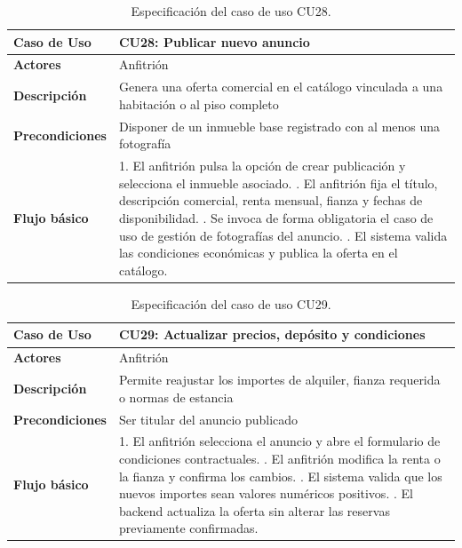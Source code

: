 \begin{table}[H]
\centering
\begin{tabular}{|p{3.1cm}|p{10.9cm}|}
\hline
\textbf{Caso de Uso} & \textbf{CU28: Publicar nuevo anuncio} \\ \hline
\textbf{Actores} & Anfitrión \\ \hline
\textbf{Descripción} & Genera una oferta comercial en el catálogo vinculada a una habitación o al piso completo \\ \hline
\textbf{Precondiciones} & Disponer de un inmueble base registrado con al menos una fotografía \\ \hline
\textbf{Flujo básico} & 
1. El anfitrión pulsa la opción de crear publicación y selecciona el inmueble asociado. \newline
2. El anfitrión fija el título, descripción comercial, renta mensual, fianza y fechas de disponibilidad. \newline
3. Se invoca de forma obligatoria el caso de uso de gestión de fotografías del anuncio. \newline
4. El sistema valida las condiciones económicas y publica la oferta en el catálogo. \\ \hline
\end{tabular}
\caption{Especificación del caso de uso CU28.}
\label{tab:cu28}
\end{table}

\begin{table}[H]
\centering
\begin{tabular}{|p{3.1cm}|p{10.9cm}|}
\hline
\textbf{Caso de Uso} & \textbf{CU29: Actualizar precios, depósito y condiciones} \\ \hline
\textbf{Actores} & Anfitrión \\ \hline
\textbf{Descripción} & Permite reajustar los importes de alquiler, fianza requerida o normas de estancia \\ \hline
\textbf{Precondiciones} & Ser titular del anuncio publicado \\ \hline
\textbf{Flujo básico} & 
1. El anfitrión selecciona el anuncio y abre el formulario de condiciones contractuales. \newline
2. El anfitrión modifica la renta o la fianza y confirma los cambios. \newline
3. El sistema valida que los nuevos importes sean valores numéricos positivos. \newline
4. El backend actualiza la oferta sin alterar las reservas previamente confirmadas. \\ \hline
\end{tabular}
\caption{Especificación del caso de uso CU29.}
\label{tab:cu29}
\end{table}

